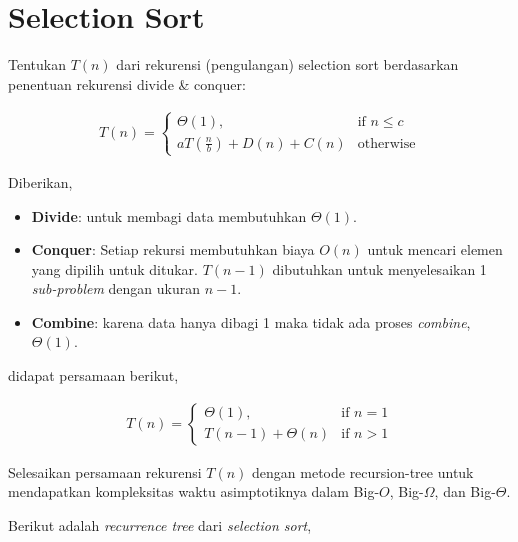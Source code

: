 \section{Selection Sort}

\Problem Tentukan $T(n)$ dari rekurensi (pengulangan) selection sort berdasarkan penentuan rekurensi divide \& conquer:

\begin{align*}
    T(n) =
        \begin{cases}
            \Theta(1),                      & \text{if } n \leq c \\
            aT(\frac{n}{b}) + D(n) + C(n)   & \text{otherwise}
        \end{cases}
\end{align*}

\TheSolution
Diberikan,

\begin{itemize}
    \item \textbf{Divide}: untuk membagi data membutuhkan $\Theta(1)$.
    \item \textbf{Conquer}: Setiap rekursi membutuhkan biaya $O(n)$ untuk mencari elemen yang dipilih untuk ditukar. $T(n - 1)$ dibutuhkan untuk menyelesaikan 1 \textit{sub-problem} dengan ukuran $n - 1$.
    \item \textbf{Combine}: karena data hanya dibagi 1 maka tidak ada proses \textit{combine}, $\Theta(1)$.
\end{itemize}

didapat persamaan berikut,

\begin{align*}
    T(n) =
        \begin{cases}
            \Theta(1),              & \text{if } n = 1 \\
            T(n - 1) + \Theta(n)    & \text{if } n > 1
        \end{cases}
\end{align*}

\Problem Selesaikan persamaan rekurensi $T(n)$ dengan metode recursion-tree untuk mendapatkan
kompleksitas waktu asimptotiknya dalam Big-$O$, Big-$\Omega$, dan Big-$\Theta$.

\TheSolution Berikut adalah \textit{recurrence tree} dari \textit{selection sort},

